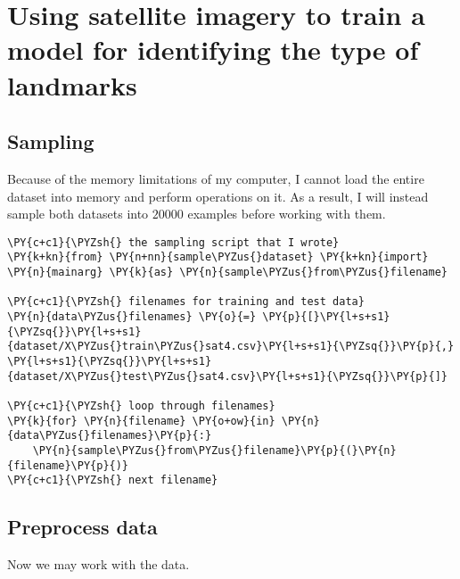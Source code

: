     \hypertarget{using-satellite-imagery-to-train-a-model-for-identifying-the-type-of-landmarks}{%
\section{Using satellite imagery to train a model for identifying the
type of
landmarks}\label{using-satellite-imagery-to-train-a-model-for-identifying-the-type-of-landmarks}}

    \hypertarget{sampling}{%
\subsection{Sampling}\label{sampling}}

Because of the memory limitations of my computer, I cannot load the
entire dataset into memory and perform operations on it. As a result, I
will instead sample both datasets into \({20000}\) examples before
working with them.

    \begin{tcolorbox}[breakable, size=fbox, boxrule=1pt, pad at break*=1mm,colback=cellbackground, colframe=cellborder]
\begin{Verbatim}[commandchars=\\\{\}]
\PY{c+c1}{\PYZsh{} the sampling script that I wrote}
\PY{k+kn}{from} \PY{n+nn}{sample\PYZus{}dataset} \PY{k+kn}{import} \PY{n}{mainarg} \PY{k}{as} \PY{n}{sample\PYZus{}from\PYZus{}filename}

\PY{c+c1}{\PYZsh{} filenames for training and test data}
\PY{n}{data\PYZus{}filenames} \PY{o}{=} \PY{p}{[}\PY{l+s+s1}{\PYZsq{}}\PY{l+s+s1}{dataset/X\PYZus{}train\PYZus{}sat4.csv}\PY{l+s+s1}{\PYZsq{}}\PY{p}{,} \PY{l+s+s1}{\PYZsq{}}\PY{l+s+s1}{dataset/X\PYZus{}test\PYZus{}sat4.csv}\PY{l+s+s1}{\PYZsq{}}\PY{p}{]}

\PY{c+c1}{\PYZsh{} loop through filenames}
\PY{k}{for} \PY{n}{filename} \PY{o+ow}{in} \PY{n}{data\PYZus{}filenames}\PY{p}{:}
    \PY{n}{sample\PYZus{}from\PYZus{}filename}\PY{p}{(}\PY{n}{filename}\PY{p}{)}
\PY{c+c1}{\PYZsh{} next filename}
\end{Verbatim}
\end{tcolorbox}

    \hypertarget{preprocess-data}{%
\subsection{Preprocess data}\label{preprocess-data}}

Now we may work with the data.

